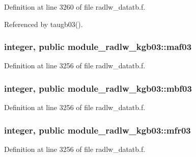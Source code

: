 Definition at line 3260 of file radlw\+\_\+datatb.\+f.



Referenced by taugb03().

\subsubsection[{\texorpdfstring{maf03}{maf03}}]{\setlength{\rightskip}{0pt plus 5cm}integer, public module\+\_\+radlw\+\_\+kgb03\+::maf03}\hypertarget{namespacemodule__radlw__kgb03_a90d1081db011f0682cb4a83c40c5bb23}{}\label{namespacemodule__radlw__kgb03_a90d1081db011f0682cb4a83c40c5bb23}


Definition at line 3256 of file radlw\+\_\+datatb.\+f.

\subsubsection[{\texorpdfstring{mbf03}{mbf03}}]{\setlength{\rightskip}{0pt plus 5cm}integer, public module\+\_\+radlw\+\_\+kgb03\+::mbf03}\hypertarget{namespacemodule__radlw__kgb03_a655fff8711d78d62ae9d4fa27d02621a}{}\label{namespacemodule__radlw__kgb03_a655fff8711d78d62ae9d4fa27d02621a}


Definition at line 3256 of file radlw\+\_\+datatb.\+f.

\subsubsection[{\texorpdfstring{mfr03}{mfr03}}]{\setlength{\rightskip}{0pt plus 5cm}integer, public module\+\_\+radlw\+\_\+kgb03\+::mfr03}\hypertarget{namespacemodule__radlw__kgb03_a4ea1e58a39585adc087718b92a16b529}{}\label{namespacemodule__radlw__kgb03_a4ea1e58a39585adc087718b92a16b529}


Definition at line 3256 of file radlw\+\_\+datatb.\+f.

